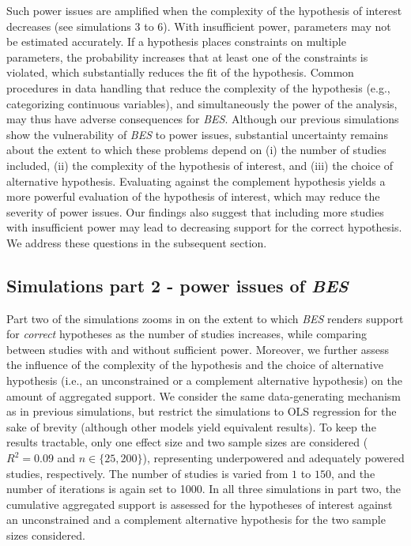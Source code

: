 \documentclass[review, 3p, authoryear]{elsarticle} %
\begin{document}
Such power issues are amplified when the complexity of the hypothesis of interest decreases (see simulations 3 to 6).
With insufficient power, parameters may not be estimated accurately.
If a hypothesis places constraints on multiple parameters, the probability increases that at least one of the constraints is violated, which substantially reduces the fit of the hypothesis.
Common procedures in data handling that reduce the complexity of the hypothesis (e.g., categorizing continuous variables), and simultaneously the power of the analysis, may thus have adverse consequences for \emph{BES}.
Although our previous simulations show the vulnerability of \emph{BES} to power issues, substantial uncertainty remains about the extent to which these problems depend on (i) the number of studies included, (ii) the complexity of the hypothesis of interest, and (iii) the choice of alternative hypothesis.
Evaluating against the complement hypothesis yields a more powerful evaluation of the hypothesis of interest, which may reduce the severity of power issues.
Our findings also suggest that including more studies with insufficient power may lead to decreasing support for the correct hypothesis.
We address these questions in the subsequent section.

\hypertarget{simulations-part-2---power-issues-of-bes}{%
\subsection{\texorpdfstring{Simulations part 2 - power issues of \emph{BES}}{Simulations part 2 - power issues of BES}}\label{simulations-part-2---power-issues-of-bes}}

Part two of the simulations zooms in on the extent to which \emph{BES} renders support for \emph{correct} hypotheses as the number of studies increases, while comparing between studies with and without sufficient power.
Moreover, we further assess the influence of the complexity of the hypothesis and the choice of alternative hypothesis (i.e., an unconstrained or a complement alternative hypothesis) on the amount of aggregated support.
We consider the same data-generating mechanism as in previous simulations, but restrict the simulations to OLS regression for the sake of brevity (although other models yield equivalent results).
To keep the results tractable, only one effect size and two sample sizes are considered (\(R^2 = 0.09\) and \(n \in \{25, 200\}\)), representing underpowered and adequately powered studies, respectively.
The number of studies is varied from \(1\) to \(150\), and the number of iterations is again set to 1000.
In all three simulations in part two, the cumulative aggregated support is assessed for the hypotheses of interest against an unconstrained and a complement alternative hypothesis for the two sample sizes considered.
\end{document}
